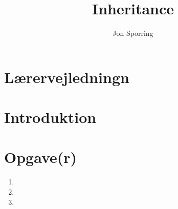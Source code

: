 \documentclass[a4paper,12pt]{article}
\title{Inheritance}
\author{Jon Sporring}
\begin{document}
\maketitle

\section{Lærervejledningn}

\section{Introduktion}

\section{Opgave(r)}
\begin{enumerate}
\item 
\item 
\item 
\end{enumerate}
\end{document}
